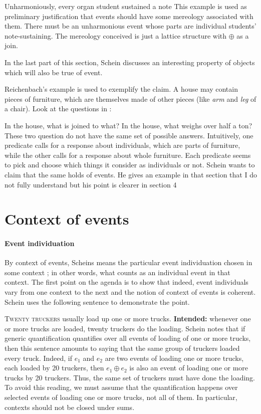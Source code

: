  \ex
 Unharmoniously, every organ student sustained a note
 \xe
 This example is used as preliminary justification that events should have some mereology associated with them. There must be an unharmonious event whose parts are individual students' note-sustaining. The mereology conceived is just a lattice structure with $\oplus$ as a join.

 In the last part of this section, Schein discusses an interesting property of objects which will also be true of event. 

 \begin{center}
 \end{center}

 Reichenbach's example is used to exemplify the claim. A house may contain pieces of furniture, which are themselves made of other pieces (like \emph{arm} and \emph{leg} of a chair). Look at the questions in \cnextx:

 \pex
 \a 
 In the house, what is joined to what?
 \a 
 In the house, what weighs over half a ton?
 \xe
 These two question do not have the same set of possible answers. Intuitively, one predicate calls for a response about individuals, which are parts of furniture, while the other calls for a response about whole furniture. Each predicate seems to pick and choose which things it consider as individuals or not. Schein wants to claim that the same holds of events. He gives an example in that section that I do not fully understand but his point is clearer in section 4

 \section{Context of events}

\paragraph{Event individuation}
 By context of events, Scheins means the particular event individuation chosen in some context ; in other words, what counts as an individual event in that context. The first point on the agenda is to show that indeed, event individuals vary from one context to the next and the notion of context of events is coherent. Schein uses the following sentence to demonstrate the point. 

 \pex
 \a
 \textsc{Twenty truckers} usually load up one or more trucks.
 \a
\textbf{Intended:} whenever one or more trucks are loaded, twenty truckers do the loading.
 \xe
 Schein notes that if generic quantification quantifies over all events of loading of one or more trucks, then this sentence amounts to saying that the same group of truckers loaded every truck. Indeed, if $e_1$ and $e_2$ are two events of loading one or more trucks, each loaded by 20 truckers, then $e_1\oplus e_2$ is also an event of loading one or more trucks by 20 truckers. Thus, the same set of truckers must have done the loading. To avoid this reading, we must assume that the quantification happens over selected events of loading one or more trucks, not all of them. In particular, contexts should not be closed under sums.

